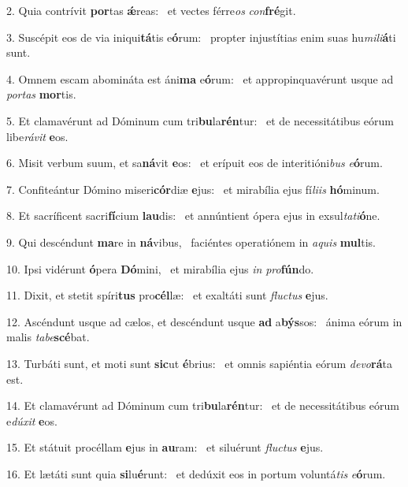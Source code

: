 2. Quia contrívit \textbf{por}tas \textbf{ǽ}reas: \ast\  et vectes férre\textit{os} \textit{con}\textbf{fré}git.\

3. Suscépit eos de via iniqui\textbf{tá}tis e\textbf{ó}rum: \ast\  propter injustítias enim suas hu\textit{mi}\textit{li}\textbf{á}ti sunt.\

4. Omnem escam abomináta est áni\textbf{ma} e\textbf{ó}rum: \ast\  et appropinquavérunt usque ad \textit{por}\textit{tas} \textbf{mor}tis.\

5. Et clamavérunt ad Dóminum cum tri\textbf{bu}la\textbf{rén}tur: \ast\  et de necessitátibus eórum libe\textit{rá}\textit{vit} \textbf{e}os.\

6. Misit verbum suum, et sa\textbf{ná}vit \textbf{e}os: \ast\  et erípuit eos de interitióni\textit{bus} \textit{e}\textbf{ó}rum.\

7. Confiteántur Dómino miseri\textbf{cór}diæ \textbf{e}jus: \ast\  et mirabília ejus fí\textit{li}\textit{is} \textbf{hó}minum.\

8. Et sacríficent sacri\textbf{fí}cium \textbf{lau}dis: \ast\  et annúntient ópera ejus in exsul\textit{ta}\textit{ti}\textbf{ó}ne.\

9. Qui descéndunt \textbf{ma}re in \textbf{ná}vibus, \ast\  faciéntes operatiónem in \textit{a}\textit{quis} \textbf{mul}tis.\

10. Ipsi vidérunt \textbf{ó}pera \textbf{Dó}mini, \ast\  et mirabília ejus \textit{in} \textit{pro}\textbf{fún}do.\

11. Dixit, et stetit spíri\textbf{tus} pro\textbf{cél}læ: \ast\  et exaltáti sunt \textit{fluc}\textit{tus} \textbf{e}jus.\

12. Ascéndunt usque ad cælos, et descéndunt usque \textbf{ad} a\textbf{býs}sos: \ast\  ánima eórum in malis \textit{ta}\textit{be}\textbf{scé}bat.\

13. Turbáti sunt, et moti sunt \textbf{sic}ut \textbf{é}brius: \ast\  et omnis sapiéntia eórum \textit{de}\textit{vo}\textbf{rá}ta est.\

14. Et clamavérunt ad Dóminum cum tri\textbf{bu}la\textbf{rén}tur: \ast\  et de necessitátibus eórum e\textit{dú}\textit{xit} \textbf{e}os.\

15. Et státuit procéllam \textbf{e}jus in \textbf{au}ram: \ast\  et siluérunt \textit{fluc}\textit{tus} \textbf{e}jus.\

16. Et lætáti sunt quia \textbf{si}lu\textbf{é}runt: \ast\  et dedúxit eos in portum voluntá\textit{tis} \textit{e}\textbf{ó}rum.\

